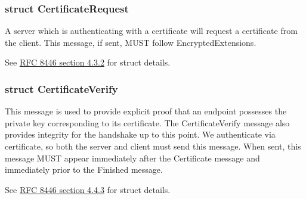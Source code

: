 \documentclass{article}
\begin{document}
\subsubsection{struct CertificateRequest}
A server which is authenticating with a certificate will request a certificate from the client.
This message, if sent, MUST follow EncryptedExtensions.

See \href{https://datatracker.ietf.org/doc/html/rfc8446#section-4.3.2}{RFC 8446 section 4.3.2\tiny\faExternalLink} for struct details.


\subsubsection{struct CertificateVerify}
This message is used to provide explicit proof that an endpoint possesses the private key corresponding to its certificate.
The CertificateVerify message also provides integrity for the handshake up to this point.
We authenticate via certificate, so both the server and client must send this message.
When sent, this message MUST appear immediately after the Certificate message and immediately prior to the Finished message.

See \href{https://datatracker.ietf.org/doc/html/rfc8446#section-4.4.3}{RFC 8446 section 4.4.3\tiny\faExternalLink} for struct details.
\end{document}
